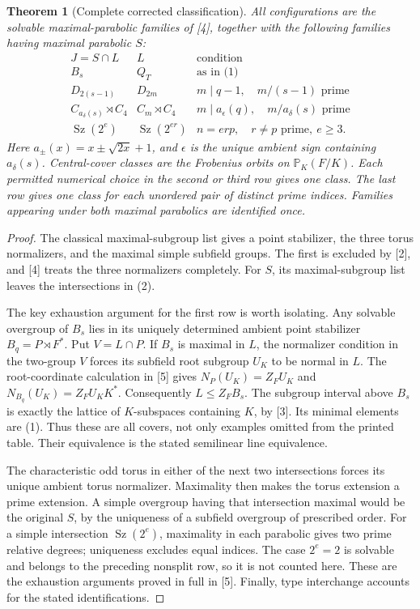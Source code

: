 \documentclass[11pt]{article}
\newtheorem{theorem}{Theorem}
\newcommand{\Sz}{\operatorname{Sz}}
\begin{document}
\begin{theorem}[Complete corrected classification]\label{classification}
All configurations are the solvable maximal-parabolic families of [4],
together with the following families having maximal parabolic $S$:
\[
\begin{array}{c|c|l}
J=S\cap L&L&\text{condition}\\\hline
 B_s&Q_T&\text{as in (1)}\\
 D_{2(s-1)}&D_{2m}&m\mid q-1,\quad m/(s-1)\text{ prime}\\
 C_{a_\delta(s)}\rtimes C_4&C_m\rtimes C_4&
 m\mid a_\epsilon(q),\quad m/a_\delta(s)\text{ prime}\\
 \Sz(2^e)&\Sz(2^{er})&n=erp,\quad r\ne p\text{ prime},\ e\ge3.
\end{array}                                                   \tag{2}
\]
Here $a_\pm(x)=x\pm\sqrt{2x}+1$, and $\epsilon$ is the unique ambient
sign containing $a_\delta(s)$. Central-cover classes are the Frobenius
orbits on $\mathbb P_K(F/K)$. Each permitted numerical choice in the
second or third row gives one class. The last row gives one class for
each unordered pair of distinct prime indices. Families appearing
under both maximal parabolics are identified once.
\end{theorem}
\begin{proof}
The classical maximal-subgroup list gives a point stabilizer, the three
torus normalizers, and the maximal simple subfield groups. The first is
excluded by [2], and [4] treats the three normalizers completely.
For $S$, its maximal-subgroup list leaves the intersections in (2).

The key exhaustion argument for the first row is worth isolating.
Any solvable overgroup of $B_s$ lies in its uniquely determined ambient
point stabilizer $B_q=P\rtimes F^*$. Put $V=L\cap P$.
If $B_s$ is maximal in $L$, the normalizer condition in the two-group
$V$ forces its subfield root subgroup $U_K$ to be normal in $L$.
The root-coordinate calculation in [5] gives
$N_P(U_K)=Z_FU_K$ and $N_{B_q}(U_K)=Z_FU_KK^*$.
Consequently $L\le Z_FB_s$. The subgroup interval above $B_s$ is
exactly the lattice of $K$-subspaces containing $K$, by [3]. Its
minimal elements are (1). Thus these are all covers, not only examples
omitted from the printed table. Their equivalence is the stated
semilinear line equivalence.

The characteristic odd torus in either of the next two intersections
forces its unique ambient torus normalizer. Maximality then makes the
torus extension a prime extension. A simple overgroup having that
intersection maximal would be the original $S$, by the uniqueness of
a subfield overgroup of prescribed order. For a simple intersection
$\Sz(2^e)$, maximality in each parabolic gives two prime relative degrees;
uniqueness excludes equal indices. The case $2^e=2$ is solvable and
belongs to the preceding nonsplit row, so it is not counted here.
These are the exhaustion arguments proved in full in [5]. Finally,
type interchange accounts for the stated identifications.
\end{proof}
\end{document}

